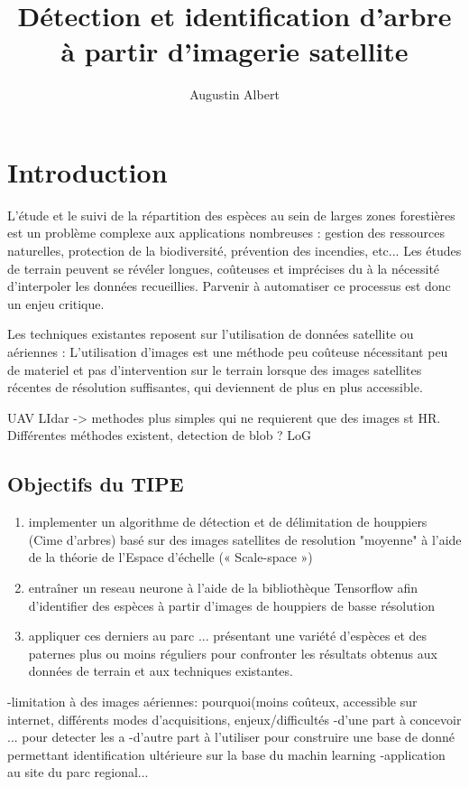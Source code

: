 \documentclass{article}
\title{Détection et identification d'arbre à partir d'imagerie satellite}
\author{Augustin Albert}
\begin{document}
\maketitle
\tableofcontents

\section*{Introduction}

L'étude et le suivi de la répartition des espèces au sein de larges zones forestières est un problème complexe aux applications nombreuses :
gestion des ressources naturelles, protection de la biodiversité, prévention des incendies, etc... Les études de terrain peuvent se révéler longues, coûteuses et imprécises du à la nécessité d'interpoler les données recueillies. 
Parvenir à automatiser ce processus est donc un enjeu critique. 

Les techniques existantes reposent sur l'utilisation de données satellite ou aériennes : L'utilisation d'images est une méthode peu coûteuse nécessitant peu de materiel et pas d'intervention sur le terrain lorsque 
des images satellites récentes de résolution suffisantes, qui deviennent de plus en plus accessible.  

UAV LIdar -> methodes plus simples qui ne requierent que des images st HR. Différentes méthodes existent, detection de blob ? LoG

\subsection*{Objectifs du TIPE}		
\begin{enumerate}
	\item implementer un algorithme de détection et de délimitation de houppiers (Cime d'arbres) basé sur des images satellites de resolution "moyenne" à l'aide de la théorie de l'Espace d'échelle (« Scale-space ») 
	\item entraîner un reseau neurone à l'aide de la bibliothèque Tensorflow afin d'identifier des espèces à partir d'images de houppiers de basse résolution 
	\item appliquer ces derniers au parc ... présentant une variété d'espèces et des paternes plus ou moins réguliers pour confronter les résultats obtenus aux données de terrain et aux techniques existantes.    
\end{enumerate}
	
		-limitation à des images aériennes: pourquoi(moins coûteux, accessible sur internet, différents modes d'acquisitions,  enjeux/difficultés
		-d'une part à concevoir ... pour detecter les a
		-d'autre part à l'utiliser pour construire une base de donné permettant identification ultérieure sur la base du machin learning
		-application au site du parc regional...
		
\end{document}

